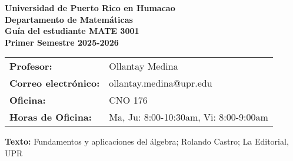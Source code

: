 \documentclass{article}
\begin{document}
\begin{center}
    \textbf{Universidad de Puerto Rico en Humacao} \\
    \textbf{Departamento de Matemáticas} \\
    \textbf{Guía del estudiante MATE 3001} \\
    \textbf{Primer Semestre 2025-2026}
\end{center}

\vspace{0.25cm}

\noindent
\begin{tabular}{@{}ll@{}}
	\textbf{Profesor:} & Ollantay Medina \\
	\textbf{Correo electrónico:} & ollantay.medina@upr.edu \\
	\textbf{Oficina:} & CNO 176 \\
	\textbf{Horas de Oficina:} & Ma, Ju: 8:00-10:30am, Vi: 8:00-9:00am \\
\end{tabular}

\vspace{0.25cm}

\noindent \textbf{Texto:} Fundamentos y aplicaciones del álgebra; Rolando Castro; La Editorial, UPR

\vspace{0.25cm}
\end{document}
